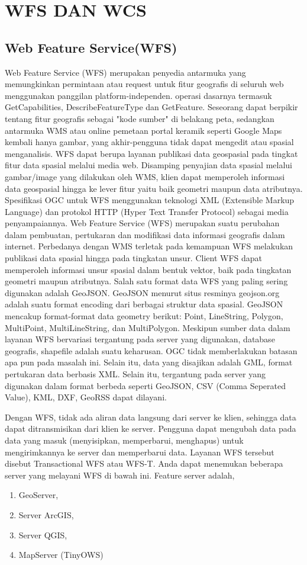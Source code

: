 \section{WFS DAN WCS}

\subsection{Web Feature Service(WFS)}
Web Feature Service (WFS) merupakan penyedia antarmuka yang memungkinkan permintaan atau request untuk fitur geografis di seluruh web menggunakan panggilan platform-independen. operasi dasarnya termasuk GetCapabilities, DescribeFeatureType dan GetFeature. Seseorang dapat berpikir tentang fitur geografis sebagai "kode sumber" di belakang peta, sedangkan antarmuka WMS atau online pemetaan portal keramik seperti Google Maps kembali hanya gambar, yang akhir-pengguna tidak dapat mengedit atau spasial menganalisis\cite{franto2015integrasi}.
WFS dapat berupa layanan publikasi data geospasial pada tingkat fitur data spasial melalui media web. Disamping penyajian data spasial melalui gambar/image yang dilakukan oleh WMS, klien dapat memperoleh informasi data geospasial hingga ke lever fitur yaitu baik geometri maupun data atributnya. Spesifikasi OGC untuk WFS menggunakan teknologi XML (Extensible Markup Language) dan protokol HTTP (Hyper Text Transfer Protocol) sebagai media penyampaiannya.
Web Feature Service (WFS) merupakan suatu perubahan dalam pembuatan, pertukaran dan modifikasi data informasi geografis dalam internet. Perbedanya dengan WMS terletak pada kemampuan WFS melakukan publikasi data spasial hingga pada tingkatan unsur. Client WFS dapat memperoleh informasi unsur spasial dalam bentuk vektor, baik pada tingkatan geometri maupun atributnya. Salah satu format data WFS yang paling sering digunakan adalah GeoJSON. GeoJSON menurut situs resminya geojson.org adalah suatu format encoding dari berbagai struktur data spasial. GeoJSON mencakup format-format data geometry berikut: Point, LineString, Polygon, MultiPoint, MultiLineString, dan MultiPolygon.
Meskipun sumber data dalam layanan WFS bervariasi tergantung pada server yang digunakan, database geografis, shapefile adalah suatu keharusan. OGC tidak memberlakukan batasan apa pun pada masalah ini. Selain itu, data yang disajikan adalah GML, format pertukaran data berbasis XML. Selain itu, tergantung pada server yang digunakan dalam format berbeda seperti GeoJSON, CSV (Comma Seperated Value), KML, DXF, GeoRSS dapat dilayani.

Dengan WFS, tidak ada aliran data langsung dari server ke klien, sehingga data dapat ditransmisikan dari klien ke server. Pengguna dapat mengubah data pada data yang masuk (menyisipkan, memperbarui, menghapus) untuk mengirimkannya ke server dan memperbarui data. Layanan WFS tersebut disebut Transactional WFS atau WFS-T. Anda dapat menemukan beberapa server yang melayani WFS di bawah ini.
Feature server adalah,
\begin{enumerate}
\item GeoServer,
\item Server ArcGIS,
\item Server QGIS,
\item MapServer (TinyOWS)
\end{enumerate}

